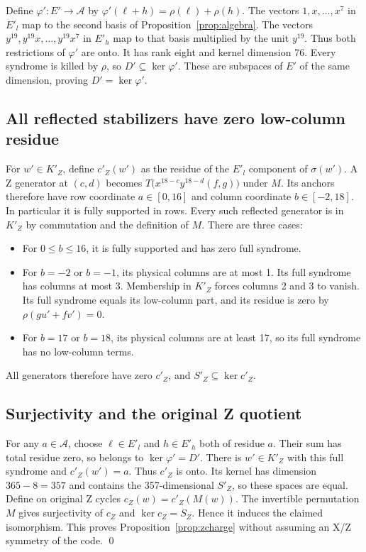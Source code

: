 \documentclass{article}
\begin{document}
Define \(\varphi' \colon E' \to \mathcal{A}\) by \(\varphi'(\ell + h) = \rho(\ell) + \rho(h)\).
The vectors \(1, x, \dots, x^7\) in \(E'_l\) map to the second basis of
Proposition~\ref{prop:algebra}. The vectors \(y^{19}, y^{19} x, \dots, y^{19} x^7\) in \(E'_h\)
map to that basis multiplied by the unit \(y^{19}\). Thus both restrictions of \(\varphi'\) are
onto. It has rank eight and kernel dimension 76. Every syndrome is killed by \(\rho\), so
\(D' \subseteq \ker\varphi'\). These are subspaces of \(E'\) of the same dimension, proving
\(D' = \ker\varphi'\).

\subsection{All reflected stabilizers have zero low-column residue}\label{sec:z-stabilizers}

For \(w' \in K'_Z\), define \(c'_Z(w')\) as the residue of the \(E'_l\) component of
\(\sigma(w')\). A Z generator at \((c,d)\) becomes \(T\bigl(x^{18-c} y^{18-d} (f, g)\bigr)\)
under \(M\). Its anchors therefore have row coordinate \(a \in [0,16]\) and column coordinate
\(b \in [-2,18]\). In particular it is fully supported in rows. Every such reflected generator is
in \(K'_Z\) by commutation and the definition of \(M\). There are three cases:
\begin{itemize}
  \item For \(0 \le b \le 16\), it is fully supported and has zero full syndrome.
  \item For \(b = -2\) or \(b = -1\), its physical columns are at most 1. Its full syndrome has
    columns at most 3. Membership in \(K'_Z\) forces columns 2 and 3 to vanish. Its full
    syndrome equals its low-column part, and its residue is zero by \(\rho(gu' + fv') = 0\).
  \item For \(b = 17\) or \(b = 18\), its physical columns are at least 17, so its full syndrome
    has no low-column terms.
\end{itemize}
All generators therefore have zero \(c'_Z\), and \(S'_Z \subseteq \ker c'_Z\).

\subsection{Surjectivity and the original Z quotient}\label{sec:z-quotient}

For any \(a \in \mathcal{A}\), choose \(\ell \in E'_l\) and \(h \in E'_h\) both of residue \(a\).
Their sum has total residue zero, so belongs to \(\ker\varphi' = D'\). There is \(w' \in K'_Z\)
with this full syndrome and \(c'_Z(w') = a\). Thus \(c'_Z\) is onto. Its kernel has dimension
\(365 - 8 = 357\) and contains the 357-dimensional \(S'_Z\), so these spaces are equal. Define on
original Z cycles \(c_Z(w) = c'_Z(M(w))\). The invertible permutation \(M\) gives surjectivity of
\(c_Z\) and \(\ker c_Z = S_Z\). Hence it induces the claimed isomorphism. This proves
Proposition~\ref{prop:zcharge} without assuming an X/Z symmetry of the code. \qed
\end{document}
